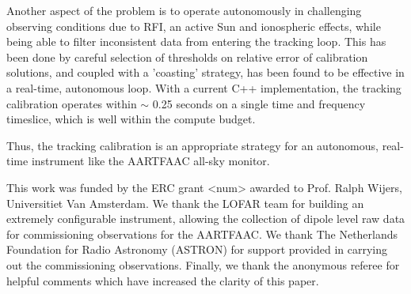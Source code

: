 \documentclass{aa}
\begin{document}
Another  aspect  of  the  problem  is to  operate  autonomously  in  challenging
observing conditions  due to RFI, an  active Sun and  ionospheric effects, while
being able to filter inconsistent data from entering the tracking loop. This has
been done  by careful selection of  thresholds on relative  error of calibration
solutions,  and  coupled  with a  'coasting'  strategy,  has  been found  to  be
effective in  a real-time, autonomous  loop. With a current  C++ implementation,
the tracking  calibration operates within $\sim$  0.25 seconds on  a single time
and frequency timeslice, which is well within the compute budget.

Thus, the  tracking calibration  is an appropriate  strategy for  an autonomous,
real-time instrument like the AARTFAAC all-sky monitor.


\begin {acknowledgements}

This work  was funded by  the ERC grant  <num> awarded to Prof.  Ralph Wijers, Universitiet Van Amsterdam. We
thank the LOFAR team for building an extremely configurable instrument, allowing
the collection of  dipole level raw data for  commissioning observations for the
AARTFAAC. We thank  The Netherlands Foundation for Radio  Astronomy (ASTRON) for
support  provided in carrying  out the  commissioning observations.  Finally, we
thank  the anonymous  referee  for  helpful comments  which  have increased  the
clarity of this paper.
\end{acknowledgements}


\end{document}
